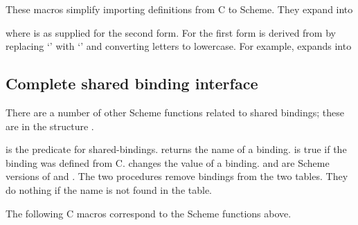 \begin{protos}
\end{protos}
These macros simplify importing definitions from C to Scheme.
They expand into


\noindent{}where  is as supplied for the second form.
For the first form  is derived from  by
 replacing `\code{-}' with `\code{\_}' and converting letters to lowercase.
For example,  expands into


\subsection{Complete shared binding interface}
\label{more-shared-bindings}

There are a number of other Scheme functions related to shared bindings;
 these are in the structure .

\begin{protos}
\end{protos}

\noindent{} is the predicate for shared-bindings.
 returns the name of a binding.
 is true if the binding was defined from C.
 changes the value of a binding.
 and  are
 Scheme versions of 
 and .
The two  procedures remove bindings from the two tables.
They do nothing if the name is not found in the table.

The following C macros correspond to the Scheme functions above.

